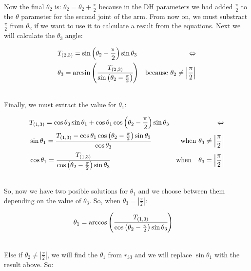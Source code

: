 Now the final \(\theta_2\) is: \(\theta_2 = \theta_2 + \frac{\pi}{2}\) because in the DH parameters we had added \(\frac{\pi}{2}\) to the \(\theta\) parameter for the second joint of the arm. From now on, we must substract \(\frac{\pi}{2}\) from \(\theta_2\) if we want to use it to calculate a result from the equations. Next we will calculate the $\theta_3$ angle:
\begin{small}
\begin{align*}
&T_{(2,3)} = \sin\left(\theta_2 - \frac{\pi}{2}\right)\sin\theta_3 &\Leftrightarrow \\
& \theta_3 = \arcsin\left( \cfrac{ T_{(2,3)} }{ \sin\left(\theta_2-\frac{\pi}{2}\right)}\right)  &\text{because }    \theta_2 \neq \left|\frac{\pi}{2}\right|\\
\end{align*}
\end{small}\\
Finally, we must extract the value for \(\theta_1\):
\begin{small}
\begin{align*}
&T_{(1,3)} = \cos\theta_3\sin\theta_1 + \cos\theta_1\cos\left(\theta_2 - \frac{\pi}{2}\right)\sin\theta_3 &\Leftrightarrow \\
&\sin\theta_1 = \cfrac{T_{(1,3)} - \cos\theta_1\cos\left(\theta_2 - \frac{\pi}{2}\right)\sin\theta_3}{\cos\theta_3}  &\text{when } \theta_3 \neq \left|\frac{\pi}{2}\right|\\
&\cos\theta_1 = \cfrac{T_{(1,3)}}{\cos\left(\theta_2 - \frac{\pi}{2}\right)\sin\theta_3}  &\text{when} \quad \theta_3 = \left|\frac{\pi}{2}\right|
\end{align*}
\end{small}\\
So, now we have two posible solutions for \(\theta_1\) and we choose between them depending on the value of \(\theta_3\). So, when $\theta_3 = \left|\frac{\pi}{2}\right|$:
\begin{small}
\begin{align*}
&\theta_1 = \arccos\left(\cfrac{T_{(1,3)}}{\cos\left(\theta_2 - \frac{\pi}{2}\right)\sin\theta_3}\right)
\end{align*}
\end{small}\\
Else if \(\theta_2 \neq \left|\frac{\pi}{2}\right|\), we will find the \(\theta_1\) from \(r_{33}\) and we will replace \(\sin\theta_1\) with the result above. So:
